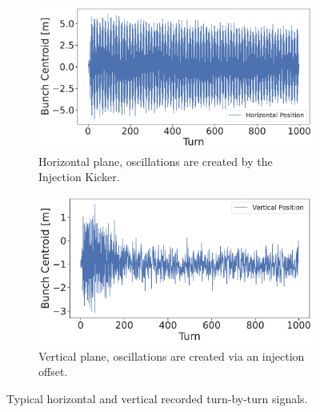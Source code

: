 \begin{figure}[!htb]
    \centering
    \begin{subfigure}[c]{0.47\textwidth}
        \includegraphics[width=\linewidth]{images/kek/horizontal_tbt_ler.pdf}
        \caption{Horizontal plane, oscillations are created by the Injection Kicker.}
    \end{subfigure}
    \hfill
    \begin{subfigure}[c]{0.48\textwidth}
        \includegraphics[width=\linewidth]{images/kek/vertical_tbt_ler.pdf}
        \caption{Vertical plane, oscillations are created via an injection offset.}
    \end{subfigure}
    \caption{Typical horizontal and vertical recorded turn-by-turn signals.}
    \label{fig:kek:tbt_signal}
\end{figure}



\subsection{}

